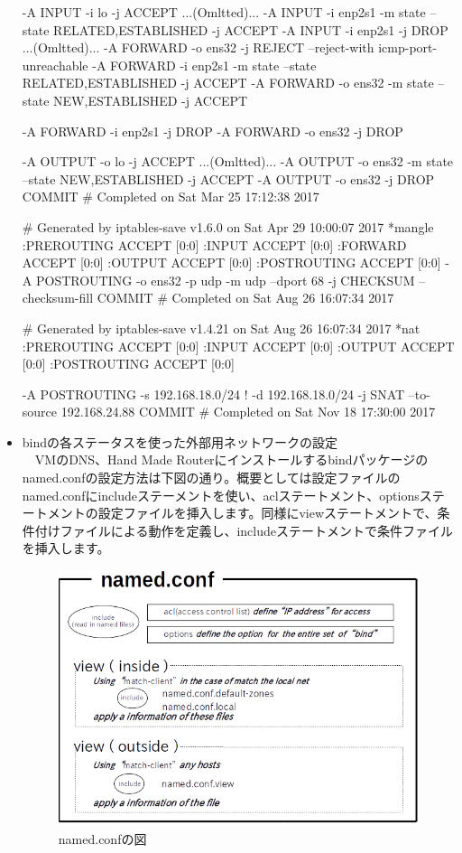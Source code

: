 \documentclass[mingoth,a4paper]{jsarticle}
\begin{document}
\begin{itemize}
\begin{commandline}
-A INPUT -i lo -j ACCEPT
...(Omltted)...
-A INPUT -i enp2s1 -m state --state RELATED,ESTABLISHED -j ACCEPT
-A INPUT -i enp2s1 -j DROP
...(Omltted)...
-A FORWARD -o ens32 -j REJECT --reject-with icmp-port-unreachable
-A FORWARD -i enp2s1 -m state --state RELATED,ESTABLISHED -j ACCEPT
-A FORWARD -o ens32 -m state --state NEW,ESTABLISHED -j ACCEPT

-A FORWARD -i enp2s1 -j DROP
-A FORWARD -o ens32 -j DROP

-A OUTPUT -o lo -j ACCEPT
...(Omltted)...
-A OUTPUT -o ens32 -m state --state NEW,ESTABLISHED -j ACCEPT
-A OUTPUT -o ens32 -j DROP
COMMIT
# Completed on Sat Mar 25 17:12:38 2017

# Generated by iptables-save v1.6.0 on Sat Apr 29 10:00:07 2017
*mangle
:PREROUTING ACCEPT [0:0]
:INPUT ACCEPT [0:0]
:FORWARD ACCEPT [0:0]
:OUTPUT ACCEPT [0:0]
:POSTROUTING ACCEPT [0:0]
-A POSTROUTING -o ens32 -p udp -m udp --dport 68 -j CHECKSUM --checksum-fill
COMMIT
# Completed on Sat Aug 26 16:07:34 2017

# Generated by iptables-save v1.4.21 on Sat Aug 26 16:07:34 2017
*nat
:PREROUTING ACCEPT [0:0]
:INPUT ACCEPT [0:0]
:OUTPUT ACCEPT [0:0]
:POSTROUTING ACCEPT [0:0]

-A POSTROUTING -s 192.168.18.0/24 ! -d 192.168.18.0/24 -j SNAT --to-source 192.168.24.88
COMMIT
# Completed on Sat Nov 18 17:30:00 2017
\end{commandline}

\clearpage

\item bindの各ステータスを使った外部用ネットワークの設定\\
　VMのDNS、Hand Made Routerにインストールするbindパッケージのnamed.confの設定方法は下図の通り。概要としては設定ファイルのnamed.confにincludeステーメントを使い、aclステートメント、optionsステートメントの設定ファイルを挿入します。同様にviewステートメントで、条件付けファイルによる動作を定義し、includeステートメントで条件ファイルを挿入します。
\begin{figure}[!h]
\centering
\includegraphics{image201803-kansai/named_conf.png}
\caption{named.confの図}
\end{figure}


\end{itemize}
\end{document}
